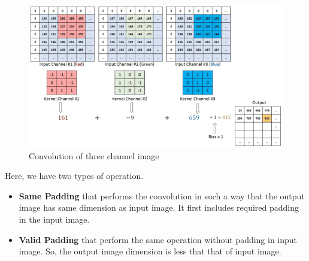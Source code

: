             \begin{figure}[h]                 
                \centering                 
                \includegraphics[width=1\textwidth]{img/experiment/convolution_of_three_channel_image.png}                 
                \caption{Convolution of three channel image}                 
                \label{fig:Convolution of three channel image}         
            \end{figure}
            Here, we have two types of operation. 
            \begin{itemize}
                \item \textbf{Same Padding} that performs the convolution in such a way that the output image has same dimension as input image. It first includes required padding in the input image.
                \item \textbf{Valid Padding} that perform the same operation without padding in input image. So, the output image dimension is less that that of input image.
            \end{itemize}

